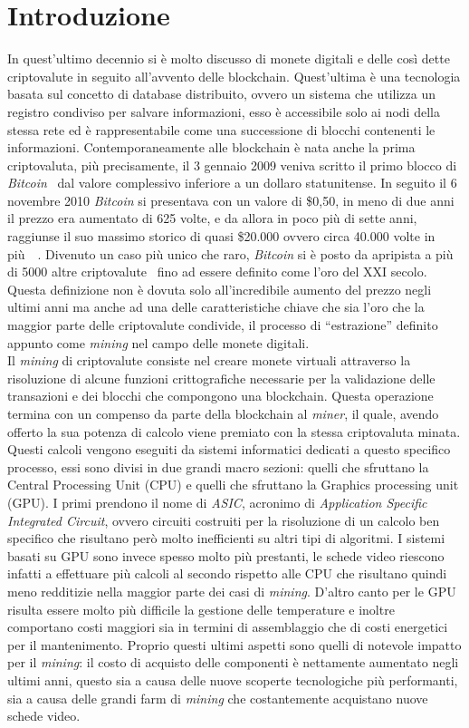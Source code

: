 \documentclass[conference]{IEEEtran}
\begin{document}
\section{Introduzione}
In quest'ultimo decennio si è molto discusso di monete digitali e delle così dette criptovalute in seguito all'avvento delle blockchain. Quest'ultima è una tecnologia basata sul concetto di database distribuito, ovvero un sistema che utilizza un registro condiviso per salvare informazioni, esso è accessibile solo ai nodi della stessa rete ed è rappresentabile come una successione di blocchi contenenti le informazioni. Contemporaneamente alle blockchain è nata anche la prima criptovaluta, più precisamente, il 3 gennaio 2009 veniva scritto il primo blocco di \emph{Bitcoin}~\citep{kharraz2019outguard} dal valore complessivo inferiore a un dollaro statunitense. In seguito il 6 novembre 2010 \emph{Bitcoin} si presentava con un valore di \$0,50, in meno di due anni il prezzo era aumentato di 625 volte, e da allora in poco più di sette anni, raggiunse il suo massimo storico di quasi \$20.000 ovvero circa 40.000 volte in più~\citep{bitcoinwiki}~\citep{wiredbitcoin}. Divenuto un caso più unico che raro, \emph{Bitcoin} si è posto da apripista a più di 5000 altre criptovalute~\citep{coinlore} fino ad essere definito come l'oro del \RN{21} secolo. Questa definizione non è dovuta solo all'incredibile aumento del prezzo negli ultimi anni ma anche ad una delle caratteristiche chiave che sia l'oro che la maggior parte delle criptovalute condivide, il processo di ``estrazione'' definito appunto come \emph{mining} nel campo delle monete digitali.\\
Il \emph{mining} di criptovalute consiste nel creare monete virtuali attraverso la risoluzione di alcune funzioni crittografiche necessarie per la validazione delle transazioni e dei blocchi che compongono una blockchain. Questa operazione termina con un compenso da parte della blockchain al \emph{miner}, il quale, avendo offerto la sua potenza di calcolo viene premiato con la stessa criptovaluta minata. Questi calcoli vengono eseguiti da sistemi informatici dedicati a questo specifico processo, essi sono divisi in due grandi macro sezioni: quelli che sfruttano la Central Processing Unit (CPU) e quelli che sfruttano la Graphics processing unit (GPU). I primi prendono il nome di \emph{ASIC}, acronimo di \emph{Application Specific Integrated Circuit}, ovvero circuiti costruiti per la risoluzione di un calcolo ben specifico che risultano però molto inefficienti su altri tipi di algoritmi. I sistemi basati su GPU sono invece spesso molto più prestanti, le schede video riescono infatti a effettuare più calcoli al secondo rispetto alle CPU che risultano quindi meno redditizie nella maggior parte dei casi di \emph{mining}. D'altro canto per le GPU risulta essere molto più difficile la gestione delle temperature e inoltre comportano costi maggiori sia in termini di assemblaggio che di costi energetici per il mantenimento. Proprio questi ultimi aspetti sono quelli di notevole impatto per il \emph{mining}: il costo di acquisto delle componenti è nettamente aumentato negli ultimi anni, questo sia a causa delle nuove scoperte tecnologiche più performanti, sia a causa delle grandi farm di \emph{mining} che costantemente acquistano nuove schede video.\\
\end{document}
